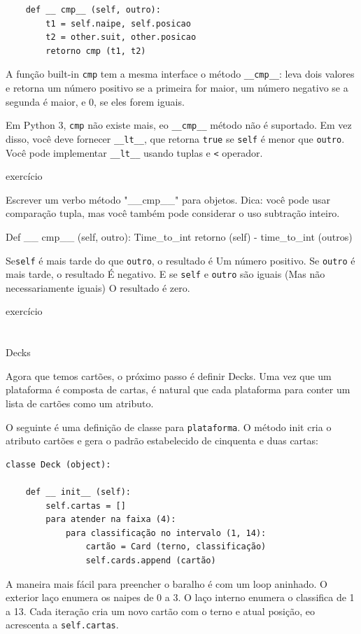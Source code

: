 \documentclass[10pt]{book}
\begin{document}
\begin{v erbatim}
\begin{verbatim}
    def __ cmp__ (self, outro):
        t1 = self.naipe, self.posicao
        t2 = other.suit, other.posicao
        retorno cmp (t1, t2)
\end{verbatim}
%
A função built-in {\tt cmp} tem a mesma interface
o método \verb "__cmp__": leva dois valores e retorna
um número positivo se a primeira for maior, um número negativo
se a segunda é maior, e 0, se eles forem iguais.

Em Python 3, {\tt cmp} não existe mais, eo \verb "__cmp__"
método não é suportado. Em vez disso, você deve fornecer \verb "__lt__",
que retorna {\tt true} se {\tt self} é menor que {\tt outro}.
Você pode implementar \verb "__lt__" usando tuplas e \verb "<"
operador.

\begin{} exercício

Escrever um verbo método "__cmp__" \Tempo para objetos. Dica: você
pode usar comparação tupla, mas você também pode considerar o uso
subtração inteiro.

Def __ cmp__ (self, outro):
Time_to_int retorno (self) - time_to_int (outros)

Se{\tt self} é mais tarde do que {\tt outro}, o resultado é
Um número positivo. Se {\tt outro} é mais tarde, o resultado
É negativo. E se {\tt self} e {\tt outro} são iguais
(Mas não necessariamente iguais)
O resultado é zero.

\end{} exercício


\section{} Decks

Agora que temos cartões, o próximo passo é definir Decks. Uma vez que um
plataforma é composta de cartas, é natural que cada plataforma para conter um
lista de cartões como um atributo.

O seguinte é uma definição de classe para {\tt plataforma}. O
método init cria o atributo {cartões \tt} e gera
o padrão estabelecido de cinquenta e duas cartas:

\begin{verbatim}
classe Deck (object):

    def __ init__ (self):
        self.cartas = []
        para atender na faixa (4):
            para classificação no intervalo (1, 14):
                cartão = Card (terno, classificação)
                self.cards.append (cartão)
\end{verbatim}
%
A maneira mais fácil para preencher o baralho é com um loop aninhado. O exterior
laço enumera os naipes de 0 a 3. O laço interno enumera o
classifica de 1 a 13. Cada iteração
cria um novo cartão com o terno e atual posição,
eo acrescenta a {\tt self.cartas}.



\end{v erbatim}
\end{document}
